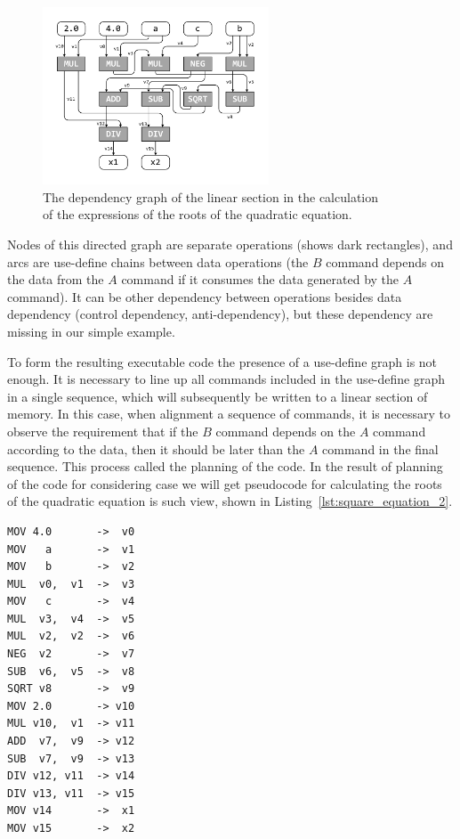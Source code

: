 \documentclass[
11pt,%
tightenlines,%
twoside,%
onecolumn,%
nofloats,%
nobibnotes,%
nofootinbib,%
superscriptaddress,%
noshowpacs,%
centertags]%
{revtex4}
\begin{document}
\begin{figure}[h]
\setcaptionmargin{5mm}
\onelinecaptionsfalse %
\includegraphics[width=0.60\textwidth]{pics/def_use.pdf}
\caption{The dependency graph of the linear section in the calculation \\ of the expressions of the roots of the quadratic equation.}\label{fig:def_use}
\end{figure}

Nodes of this directed graph are separate operations (shows dark rectangles), and arcs are use-define chains between data operations (the $B$ command depends on the data from the $A$ command if it consumes the data generated by the $A$ command). It can be other dependency between operations besides data dependency (control dependency, anti-dependency), but these dependency are missing in our simple example.

To form the resulting executable code the presence of a use-define graph is not enough. It is necessary to line up all commands included in the use-define graph in a single sequence, which will subsequently be written to a linear section of memory. In this case, when alignment a sequence of commands, it is necessary to observe the requirement that if the $B$ command depends on the $A$ command according to the data, then it should be later than the $A$ command in the final sequence. This process called the planning of the code\cite{Aho}.
In the result of planning of the code for considering case we will get pseudocode for calculating the roots of the quadratic equation is such view, shown in Listing~\ref{lst:square_equation_2}.

\begin{lstlisting}[caption={Pseudocode for calculating the roots of a quadratic equation.},label={lst:square_equation_2}]
MOV 4.0       ->  v0
MOV   a       ->  v1
MOV   b       ->  v2
MUL  v0,  v1  ->  v3
MOV   c       ->  v4
MUL  v3,  v4  ->  v5
MUL  v2,  v2  ->  v6
NEG  v2       ->  v7
SUB  v6,  v5  ->  v8
SQRT v8       ->  v9
MOV 2.0       -> v10
MUL v10,  v1  -> v11
ADD  v7,  v9  -> v12
SUB  v7,  v9  -> v13
DIV v12, v11  -> v14
DIV v13, v11  -> v15
MOV v14       ->  x1
MOV v15       ->  x2
\end{lstlisting}
\end{document}
